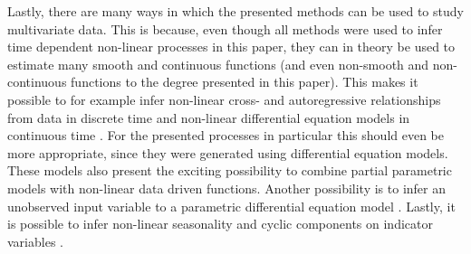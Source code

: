 \documentclass[man, floatsintext]{apa7}
\begin{document}
Lastly, there are many ways in which the presented methods can be used to study
multivariate data. This is because, even though all methods were used to infer
time dependent non-linear processes in this paper, they can in theory be used
to estimate many smooth and continuous functions (and even non-smooth and
non-continuous functions to the degree presented in this paper). This makes it
possible to for example infer non-linear cross- and autoregressive
relationships from data in discrete time \parencite{wood_generalized_2006,
  rasmussen_gaussian_2006, eleftheriadis_identification_2017} and non-linear
differential equation models in continuous time
\parencite{yildiz_learning_2018}. For the presented processes in particular
this should even be more appropriate, since they were generated using
differential equation models. These models also present the exciting
possibility to combine partial parametric models with non-linear data driven
functions. Another possibility is to infer an unobserved input variable to a
parametric differential equation model
\parencite{alvarez_latent_2009,nayek_gaussian_2019}. Lastly, it is possible to
infer non-linear seasonality and cyclic components on indicator variables
\parencite{clark_dynamic_2023}.

\printbibliography[]
\end{document}
